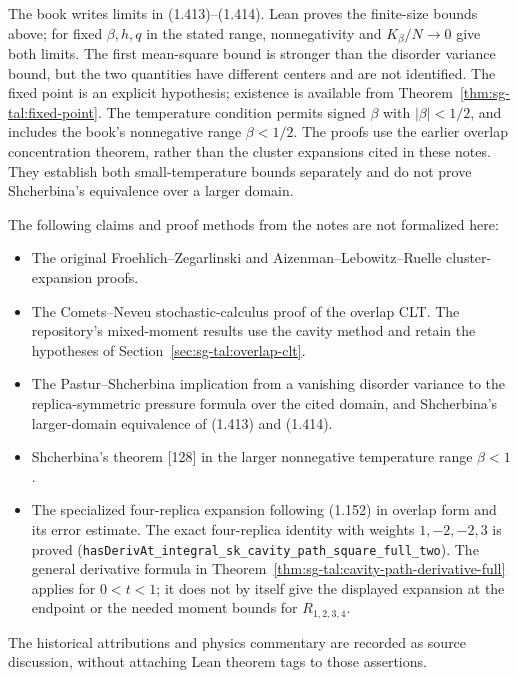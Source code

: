\begin{remark}\label{rem:sg-tal:notes-comments-scope}
The book writes limits in (1.413)--(1.414). Lean proves the finite-size bounds above;
for fixed $\beta,h,q$ in the stated range, nonnegativity and $K_\beta/N\to0$ give
both limits. The first mean-square bound is stronger than the disorder variance
bound, but the two quantities have different centers and are not identified.
The fixed point is an explicit hypothesis; existence is available from
Theorem~\ref{thm:sg-tal:fixed-point}. The temperature condition permits signed
$\beta$ with $|\beta|<1/2$, and includes the book's nonnegative range $\beta<1/2$.
The proofs use the earlier overlap concentration theorem, rather than the cluster
expansions cited in these notes. They establish both small-temperature bounds
separately and do not prove Shcherbina's equivalence over a larger domain.
\end{remark}

\begin{remark}\label{rem:sg-tal:notes-comments-unformalized}
The following claims and proof methods from the notes are not formalized here:
\begin{itemize}
\item The original Froehlich--Zegarlinski and Aizenman--Lebowitz--Ruelle cluster-expansion proofs.
\item The Comets--Neveu stochastic-calculus proof of the overlap CLT. The repository's
mixed-moment results use the cavity method and retain the hypotheses of
Section~\ref{sec:sg-tal:overlap-clt}.
\item The Pastur--Shcherbina implication from a vanishing disorder variance to the
replica-symmetric pressure formula over the cited domain, and Shcherbina's larger-domain
equivalence of (1.413) and (1.414).
\item Shcherbina's theorem [128] in the larger nonnegative temperature range $\beta<1$.
\item The specialized four-replica expansion following (1.152) in overlap form and its error estimate.
The exact four-replica identity with weights $1,-2,-2,3$ is proved (\texttt{hasDerivAt\_integral\_sk\_cavity\_path\_square\_full\_two}).
The general derivative formula in Theorem~\ref{thm:sg-tal:cavity-path-derivative-full} applies
for $0<t<1$; it does not by itself give the displayed expansion at the endpoint or
the needed moment bounds for $R_{1,2,3,4}$.
\end{itemize}
The historical attributions and physics commentary are recorded as source discussion,
without attaching Lean theorem tags to those assertions.
\end{remark}

